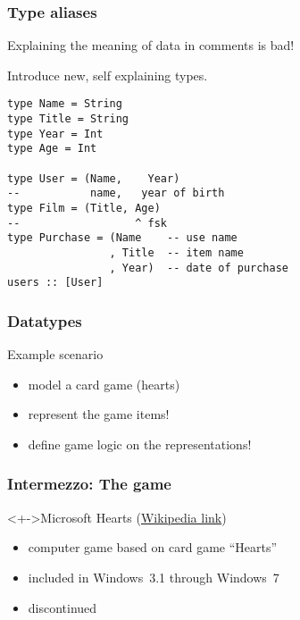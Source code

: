 \documentclass{beamer}
\subtitle{Type definitions}
\begin{document}
\begin{frame}
  \titlepage
\end{frame}
\begin{frame}[fragile]
  \frametitle{Type aliases}
Explaining the meaning of data in comments is bad!

Introduce new, self explaining types.
\begin{lstlisting}
type Name = String
type Title = String
type Year = Int
type Age = Int

type User = (Name,    Year)
--           name,   year of birth 
type Film = (Title, Age)
--                  ^ fsk           
type Purchase = (Name    -- use name
                , Title  -- item name
                , Year)  -- date of purchase
users :: [User]
\end{lstlisting}
\end{frame}
\begin{frame}[fragile]
  \frametitle{Datatypes}
  \begin{block}{Example scenario}
    \begin{itemize}
    \item model a card game (hearts)
    \item represent the game items!
    \item define game logic on the representations!
    \end{itemize}
  \end{block}
\end{frame}
\begin{frame}
  \frametitle{Intermezzo: The game}
  \begin{block}<+->{Microsoft Hearts (\href{https://en.wikipedia.org/wiki/Microsoft_Hearts}{Wikipedia link})}
    \begin{itemize}
    \item computer game based on card game ``Hearts''
    \item included in Windows~3.1 through Windows~7
    \item discontinued
    \end{itemize}    
  \end{block}
\end{frame}
\end{document}
